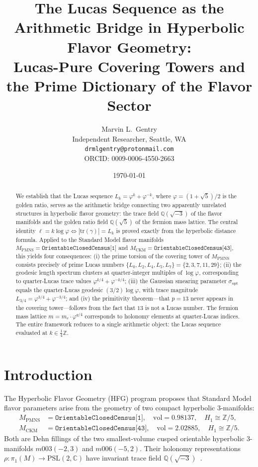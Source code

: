 \documentclass[12pt]{article}
\title{The Lucas Sequence as the Arithmetic Bridge in Hyperbolic Flavor Geometry:\\
\large Lucas-Pure Covering Towers and the Prime Dictionary of the Flavor Sector}
\author{Marvin L.\ Gentry\\
\small Independent Researcher, Seattle, WA\\
\small \texttt{drmlgentry@protonmail.com}\\
\small ORCID: 0009-0006-4550-2663}
\date{\today}
\theoremstyle{definition}
\newcommand{\Z}{\mathbb{Z}}
\newcommand{\Q}{\mathbb{Q}}
\newcommand{\C}{\mathbb{C}}
\newcommand{\ph}{\varphi}
\newcommand{\logph}{\log\ph}
\begin{document}
\maketitle

\begin{abstract}
We establish that the Lucas sequence $L_k = \ph^k + \ph^{-k}$,
where $\ph = (1+\sqrt{5})/2$ is the golden ratio, serves as the
arithmetic bridge connecting two apparently unrelated structures
in hyperbolic flavor geometry: the trace field $\Q(\sqrt{-3})$ of
the flavor manifolds and the golden ratio field $\Q(\sqrt{5})$ of
the fermion mass lattice. The central identity
$\ell = k\logph \Leftrightarrow |\mathrm{tr}(\gamma)| = L_k$
is proved exactly from the hyperbolic distance formula. Applied to
the Standard Model flavor manifolds $M_{\mathrm{PMNS}} =
\texttt{OrientableClosedCensus[1]}$ and $M_{\mathrm{CKM}} =
\texttt{OrientableClosedCensus[43]}$, this yields four consequences:
(i) the prime torsion of the covering tower of $M_{\mathrm{PMNS}}$
consists precisely of prime Lucas numbers $\{L_0, L_2, L_4, L_5,
L_7\} = \{2, 3, 7, 11, 29\}$; (ii) the geodesic length spectrum
clusters at quarter-integer multiples of $\logph$, corresponding
to quarter-Lucas trace values $\ph^{k/4} + \ph^{-k/4}$; (iii) the
Gaussian smearing parameter $\sigma_{\mathrm{opt}}$ equals the
quarter-Lucas geodesic $(3/2)\logph$, with trace magnitude
$L_{3/4} = \ph^{3/4} + \ph^{-3/4}$; and (iv) the primitivity
theorem---that $p = 13$ never appears in the covering tower---follows
from the fact that $13$ is not a Lucas number. The fermion mass
lattice $m = m_e \cdot \ph^{q/4}$ corresponds to holonomy elements
at quarter-Lucas indices. The entire framework reduces to a single
arithmetic object: the Lucas sequence evaluated at $k \in \frac{1}{4}\Z$.
\end{abstract}

\section{Introduction}

The Hyperbolic Flavor Geometry (HFG) program
\cite{gentry-ckm,gentry-pmns,gentry-cp,gentry-twist}
proposes that Standard Model flavor parameters arise from the geometry
of two compact hyperbolic 3-manifolds:
\begin{align*}
M_{\mathrm{PMNS}} &= \texttt{OrientableClosedCensus[1]},\quad
  \mathrm{vol} = 0.98137,\quad H_1 \cong \mathbb{Z}/5,\\
M_{\mathrm{CKM}}  &= \texttt{OrientableClosedCensus[43]},\quad
  \mathrm{vol} = 2.02885,\quad H_1 \cong \mathbb{Z}/5.
\end{align*}
Both are Dehn fillings of the two smallest-volume cusped orientable
hyperbolic 3-manifolds $m003(-2,3)$ and $m006(-5,2)$. Their
holonomy representations $\rho\colon \pi_1(M) \to \mathrm{PSL}(2,\C)$
have invariant trace field $\Q(\sqrt{-3})$~\cite{maclachlan-reid}.
\end{document}
